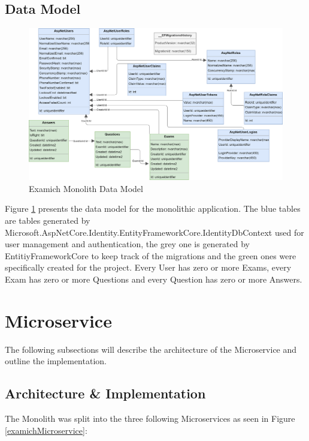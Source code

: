 \documentclass[BIF,Bachelor,nenglish]{twbook}%
\begin{document}
\subsection{Data Model}

\begin{figure} [H]
 \begin{center}
    \includegraphics[width=1.1\linewidth]{img/ExamichDataModel.png}
 \end{center}
 \caption{Examich Monolith Data Model}
 \label{datamodel}
\end{figure}

Figure \ref{datamodel} presents the data model for the monolithic application. The blue tables are tables generated by Microsoft.AspNetCore.Identity.EntityFrameworkCore.IdentityDbContext used for user management and authentication, the grey one is generated by EntitiyFrameworkCore to keep track of the migrations and the green ones were specifically created for the project. Every User has zero or more Exams, every Exam has zero or more Questions and every Question has zero or more Answers.


\section{Microservice}
The following subsections will describe the architecture of the Microservice and outline the implementation.

\subsection{Architecture \& Implementation}
The Monolith was split into the three following Microservices as seen in Figure \ref{examichMicroservice}:
\end{document}
